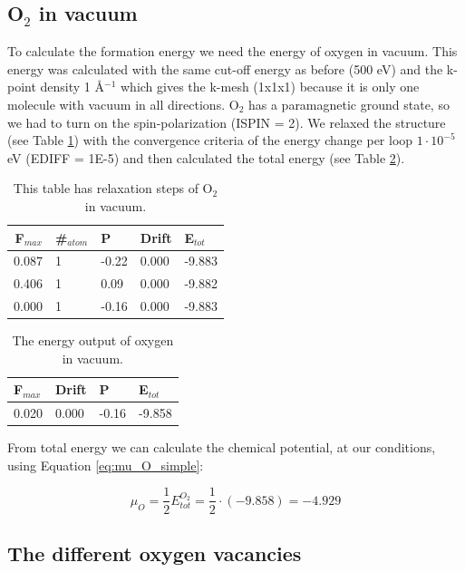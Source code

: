 \subsection{O$_2$ in vacuum}

To calculate the formation energy we need the energy of oxygen in vacuum. This energy was calculated with the same cut-off energy as before (500 eV) and the k-point density 1 Å$^{-1}$ which gives the k-mesh (1x1x1) because it is only one molecule with vacuum in all directions. O$_2$ has a paramagnetic ground state, so we had to turn on the spin-polarization (ISPIN = 2). We relaxed the structure (see Table \ref{tab:oxygen_relax}) with the convergence criteria of the energy change per loop $1\cdot 10^{-5}$ eV (EDIFF = 1E-5) and then calculated the total energy (see Table \ref{tab:oxygen_vacuum}).

\begin{table}[H]\caption{This table has relaxation steps of O$_2$ in vacuum.}\label{tab:oxygen_relax}
\begin{tabular}{rllll}
F$_{max}$ &\#$_{atom}$&	P&	Drift&	E$_{tot}$\\ \hline
0.087&	1&	-0.22&	0.000&	-9.883\\
0.406&	1&	0.09&	0.000&	-9.882\\
0.000&	1&	-0.16&	0.000&	-9.883\\
\end{tabular}
\end{table}

\begin{table}[H]\caption{The energy output of oxygen in vacuum.}\label{tab:oxygen_vacuum}
\begin{tabular}{llll}
F$_{max}$ &	Drift&	P&	E$_{tot}$ \\ \hline
0.020&	0.000&	-0.16&	-9.858\\
\end{tabular}
\end{table}

From total energy we can calculate the chemical potential, at our conditions, using Equation \ref{eq:mu_O_simple}:

\begin{equation}\label{eq:chemical_potential}
\mu_O = \frac{1}{2}E_{tot}^{O_2} = \frac{1}{2}\cdot(-9.858) = -4.929
\end{equation}

\subsection{The different oxygen vacancies}


